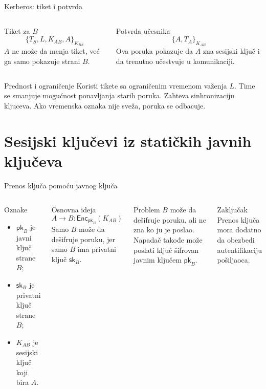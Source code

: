 \documentclass[aspectratio=1610]{beamer}
\newcommand{\enc}[2]{\{#1\}_{#2}}
\newcommand{\Enc}[2]{\mathsf{Enc}_{#1}(#2)}
\newcommand{\pk}{\mathsf{pk}}
\newcommand{\sk}{\mathsf{sk}}
\begin{document}
\begin{frame}[t]{Kerberos: tiket i potvrda}
\small
\begin{columns}[T,onlytextwidth]
\begin{block}{Tiket za $B$}
\[
\enc{T_S,L,K_{AB},A}{K_{BS}}
\]
$A$ ne može da menja tiket, već ga samo pokazuje strani $B$.
\end{block}

\begin{block}{Potvrda učesnika}
\[
\enc{A,T_A}{K_{AB}}
\]
Ova poruka pokazuje da $A$ zna sesijski ključ i da trenutno učestvuje u komunikaciji.
\end{block}
\end{columns}

\begin{alertblock}{Prednost i ograničenje}
Koristi tikete sa ograničenim vremenom važenja $L$. Time se smanjuje mogućnost ponavljanja starih poruka. 
Zahteva sinhronizaciju kljuceva. Ako vremenska oznaka nije sveža, poruka se odbacuje.
\end{alertblock}

\end{frame}

\section{Sesijski ključevi iz statičkih javnih ključeva}

\begin{frame}[t]{Prenos ključa pomoću javnog ključa}
\small
\begin{columns}[T,onlytextwidth]
\begin{block}{Oznake}
\begin{itemize}
    \item $\pk_B$ je javni ključ strane $B$;
    \item $\sk_B$ je privatni ključ strane $B$;
    \item $K_{AB}$ je sesijski ključ koji bira $A$.
\end{itemize}
\end{block}

\begin{block}{Osnovna ideja}
\[
A \rightarrow B : \Enc{\pk_B}{K_{AB}}
\]
Samo $B$ može da dešifruje poruku, jer samo $B$ ima privatni ključ $\sk_B$.
\end{block}

\begin{alertblock}{Problem}
$B$ može da dešifruje poruku, ali ne zna ko ju je poslao. Napadač takođe može poslati ključ šifrovan javnim ključem $\pk_B$.
\end{alertblock}

\begin{block}{Zaključak}
Prenos ključa mora dodatno da obezbedi autentifikaciju pošiljaoca.
\end{block}
\end{columns}
\end{frame}
\end{document}
